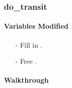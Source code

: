 \documentclass[letterpaper,12pt]{article}
\begin{document}
\subsubsection{do\_transit}
\paragraph{Variables Modified}
\begin{enumerate}[leftmargin=10pt, noitemsep, parsep=0pt, topsep=0ex]
\item[-] Fill in .
\item[-] Free .
\end{enumerate}

\paragraph{Walkthrough}
\end{document}
